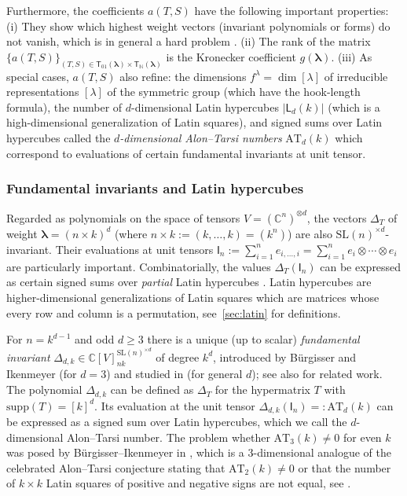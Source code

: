 \documentclass[12pt, reqno]{amsart}
\theoremstyle{definition}
\begin{document}
Furthermore, the coefficients $a(T, S)$ have the following important properties: 
(i) They show which highest weight vectors (invariant polynomials or forms) do not vanish, which is in general a hard problem \cite{bdi}. 
(ii) The rank of the matrix $\{a(T,S)\}_{(T,S) \in \mathsf{T}_{01}(\pmb{\lambda}) \times \mathsf{T}_{\mathbb{N}}(\pmb{\lambda})}$ is the Kronecker coefficient $g(\pmb{\lambda})$.
(iii) As special cases, $a(T, S)$ also refine: the dimensions $f^{\lambda} = \dim [\lambda]$  of irreducible representations $[\lambda]$ of the symmetric group (which have the hook-length formula), the number of $d$-dimensional Latin hypercubes $|\mathsf{L}_d(k)|$ (which is a high-dimensional generalization of Latin squares), and signed sums over Latin hypercubes called the \textit{$d$-dimensional Alon--Tarsi numbers} $\mathrm{AT}_d(k)$ which correspond to evaluations of certain fundamental invariants at unit tensor. 



\subsubsection*{Fundamental invariants and Latin hypercubes}
Regarded as polynomials on the space of tensors $V = (\mathbb{C}^{n})^{\otimes d}$, the vectors $\Delta_T$ of  weight $\pmb{\lambda} = (n \times k)^d$ (where $n \times k := (k, \ldots, k) = (k^n)$) are also $\mathrm{SL}(n)^{\times d}$-invariant. Their evaluations at unit tensors $\mathsf{I}_n := \sum_{i = 1}^n e_{i,\ldots, i} = \sum_{i = 1}^n e_{i} \otimes \cdots \otimes e_i$  are particularly important. Combinatorially, the values $\Delta_T(\mathsf{I}_n)$ can be expressed as certain signed sums over {\it partial} Latin hypercubes \cite{ayfund}. Latin hypercubes are higher-dimensional generalizations of Latin squares which are matrices whose every row and column is a permutation, see \textsection\,\ref{sec:latin} for definitions.  

For $n = k^{d-1}$ and odd $d \ge 3$ there is a unique (up to scalar) {\it fundamental invariant} $\Delta_{d,k} \in \mathbb{C}[V]^{\mathrm{SL}(n)^{\times d}}_{nk}$ of degree $k^{d}$, introduced by  B\"urgisser and Ikenmeyer \cite{bi} (for $d = 3$) and studied in \cite{ayfund} (for general $d$); see also \cite{LZX21} for related work. The polynomial $\Delta_{d,k}$ can be defined as $\Delta_T$ for the hypermatrix $T$ with $\mathrm{supp}(T) = [k]^d$.  Its evaluation at the unit tensor $\Delta_{d,k}(\mathsf{I}_n) =: \mathrm{AT}_d(k)$ can be expressed as a signed sum over Latin hypercubes, which we call the {$d$-dimensional Alon--Tarsi number}. The problem whether $\mathrm{AT}_3(k) \ne 0$ for even $k$ was posed by B\"urgisser--Ikenmeyer in \cite{bi}, which is a $3$-dimensional analogue of the celebrated Alon--Tarsi conjecture stating that $\mathrm{AT}_2(k) \ne 0$ or that the number of $k \times k$ Latin squares %
of positive and negative signs are not equal, see \cite{at, hr}. 
\end{document}
